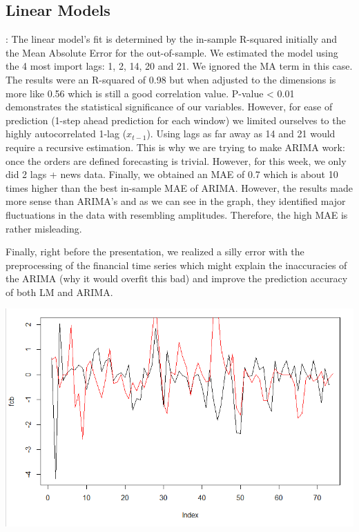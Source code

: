 \documentclass{article}
\begin{document}
	
	\subsection{Linear Models}:
	The linear model's fit is determined by the in-sample R-squared initially and the Mean Absolute Error for the out-of-sample.
	We estimated the model using the 4 most import lags: 1, 2, 14, 20 and 21. We ignored the MA term in this case.
	The results were an R-squared of 0.98 but when adjusted to the dimensions is more like 0.56 which is still a good correlation value. P-value < 0.01 demonstrates the statistical significance of our variables.
	However, for ease of prediction (1-step ahead prediction for each window) we limited ourselves to the highly autocorrelated 1-lag ($x_{t-1}$). Using lags as far away as 14 and 21 would require a recursive estimation. This is why we are trying to make ARIMA work: once the orders are defined forecasting is trivial. However, for this week, we only did 2 lags + news data.
	Finally, we obtained an MAE of 0.7 which is about 10 times higher than the best in-sample MAE of ARIMA. However, the results made more sense than ARIMA's and as we can see in the graph, they identified major fluctuations in the data with resembling amplitudes. Therefore, the high MAE is rather misleading.
	
	Finally, right before the presentation, we realized a silly error with the preprocessing of the financial time series which might explain the inaccuracies of the ARIMA (why it would overfit this bad) and improve the prediction accuracy of both LM and ARIMA.

\begin{center}
\includegraphics[scale=0.7]{../Pred820.PNG}
\end{center}
\end{document}
